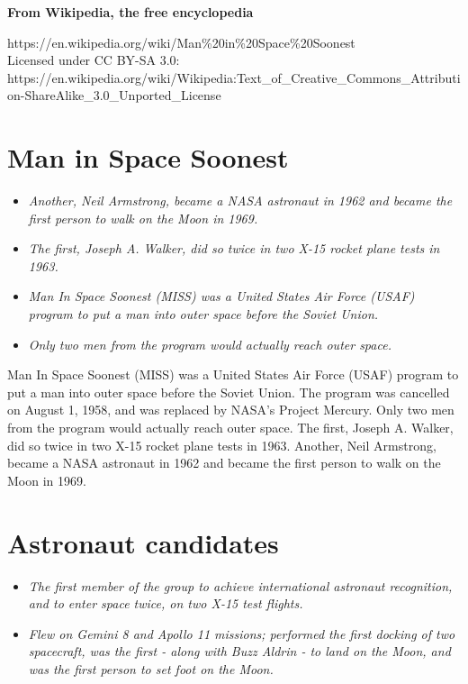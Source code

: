 \textbf{From Wikipedia, the free encyclopedia}

https://en.wikipedia.org/wiki/Man\%20in\%20Space\%20Soonest\\
Licensed under CC BY-SA 3.0:\\
https://en.wikipedia.org/wiki/Wikipedia:Text\_of\_Creative\_Commons\_Attribution-ShareAlike\_3.0\_Unported\_License

\section{Man in Space Soonest}\label{man-in-space-soonest}

\begin{itemize}
\item
  \emph{Another, Neil Armstrong, became a NASA astronaut in 1962 and
  became the first person to walk on the Moon in 1969.}
\item
  \emph{The first, Joseph A. Walker, did so twice in two X-15 rocket
  plane tests in 1963.}
\item
  \emph{Man In Space Soonest (MISS) was a United States Air Force (USAF)
  program to put a man into outer space before the Soviet Union.}
\item
  \emph{Only two men from the program would actually reach outer space.}
\end{itemize}

Man In Space Soonest (MISS) was a United States Air Force (USAF) program
to put a man into outer space before the Soviet Union. The program was
cancelled on August 1, 1958, and was replaced by NASA's Project Mercury.
Only two men from the program would actually reach outer space. The
first, Joseph A. Walker, did so twice in two X-15 rocket plane tests in
1963. Another, Neil Armstrong, became a NASA astronaut in 1962 and
became the first person to walk on the Moon in 1969.

\section{Astronaut candidates}\label{astronaut-candidates}

\begin{itemize}
\item
  \emph{The first member of the group to achieve international astronaut
  recognition, and to enter space twice, on two X-15 test flights.}
\item
  \emph{Flew on Gemini 8 and Apollo 11 missions; performed the first
  docking of two spacecraft, was the first - along with Buzz Aldrin - to
  land on the Moon, and was the first person to set foot on the Moon.}
\end{itemize}

